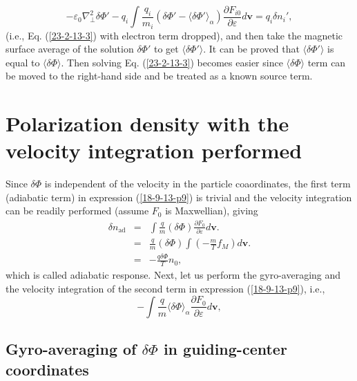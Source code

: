 \documentclass{article}
\newcommand{\tmop}[1]{\ensuremath{\operatorname{#1}}}
\begin{document}
\begin{equation}
  - \varepsilon_0 \nabla^2_{\perp} \delta \Phi' - q_i \int \frac{q_i}{m_i}
  (\delta \Phi' - \langle \delta \Phi' \rangle_{\alpha}) \frac{\partial F_{i
  0}}{\partial \varepsilon} d\mathbf{v}= q_i \delta n_i',
\end{equation}
(i.e., Eq. (\ref{23-2-13-3}) with electron term dropped), and then take the
magnetic surface average of the solution $\delta \Phi'$ to get $\langle \delta
\Phi' \rangle$. It can be proved that $\langle \delta \Phi' \rangle$ is equal
to $\langle \delta \Phi \rangle$. Then solving Eq. (\ref{23-2-13-3}) becomes
easier since $\langle \delta \Phi \rangle$ term can be moved to the right-hand
side and be treated as a known source term.

\section{Polarization density with the velocity integration
performed}\label{21-8-22-a3}

Since $\delta \Phi$ is independent of the velocity in the particle
coaordinates, the first term (adiabatic term) in expression (\ref{18-9-13-p9})
is trivial and the velocity integration can be readily performed (assume $F_0$
is Maxwellian), giving
\begin{eqnarray}
  \delta n_{\tmop{ad}} & = & \int \frac{q}{m} (\delta \Phi) \frac{\partial
  F_0}{\partial \varepsilon} d\mathbf{v}. \nonumber\\
  & = & \frac{q}{m} (\delta \Phi) \int \left( - \frac{m}{T} f_M \right)
  d\mathbf{v}. \nonumber\\
  & = & - \frac{q \delta \Phi}{T} n_0,  \label{18-11-27-1}
\end{eqnarray}
which is called adiabatic response. Next, let us perform the gyro-averaging
and the velocity integration of the second term in expression
(\ref{18-9-13-p9}), i.e.,
\begin{equation}
  \label{21-9-18-a1} - \int \frac{q }{m} \langle \delta \Phi \rangle_{\alpha}
  \frac{\partial F_0}{\partial \varepsilon} d\mathbf{v},
\end{equation}

\subsection{Gyro-averaging of $\delta \Phi$ in guiding-center coordinates}
\end{document}

